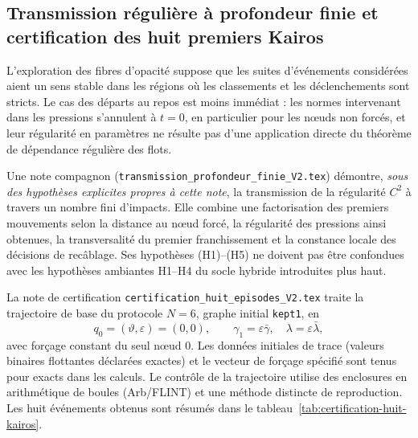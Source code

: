 \documentclass[11pt,a4paper]{article}
\theoremstyle{definition}
\theoremstyle{remark}
\begin{document}
\subsection{Transmission régulière à profondeur finie et certification des huit premiers Kairos}
\label{sec:certification-huit-kairos}

L'exploration des fibres d'opacité suppose que les suites d'événements considérées aient un sens stable dans les régions où les classements et les déclenchements sont stricts. Le cas des départs au repos est moins immédiat : les normes intervenant dans les pressions s'annulent à $t=0$, en particulier pour les nœuds non forcés, et leur régularité en paramètres ne résulte pas d'une application directe du théorème de dépendance régulière des flots.

Une note compagnon (\texttt{transmission\_profondeur\_finie\_V2.tex}) démontre, \emph{sous des hypothèses explicites propres à cette note}, la transmission de la régularité $C^2$ à travers un nombre fini d'impacts. Elle combine une factorisation des premiers mouvements selon la distance au nœud forcé, la régularité des pressions ainsi obtenues, la transversalité du premier franchissement et la constance locale des décisions de recâblage. Ses hypothèses (H1)--(H5) ne doivent pas être confondues avec les hypothèses ambiantes H1--H4 du socle hybride introduites plus haut.

La note de certification \texttt{certification\_huit\_episodes\_V2.tex} traite la trajectoire de base du protocole $N=6$, graphe initial \texttt{kept1}, en
\[
q_0=(\vartheta,\varepsilon)=(0,0),\qquad
\gamma_1=\varepsilon\bar\gamma,\quad
\lambda=\varepsilon\bar\lambda,
\]
avec forçage constant du seul nœud $0$. Les données initiales de trace (valeurs binaires flottantes déclarées exactes) et le vecteur de forçage spécifié sont tenus pour exacts dans les calculs. Le contrôle de la trajectoire utilise des enclosures en arithmétique de boules (Arb/FLINT) et une méthode distincte de reproduction. Les huit événements obtenus sont résumés dans le tableau~\ref{tab:certification-huit-kairos}.
\end{document}
